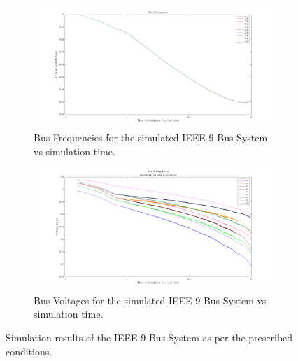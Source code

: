 \begin{figure}[!htpb]
	\centering
	\begin{subfigure}{\textwidth}
		\centering
		\includegraphics[scale=0.25]{../figures/analysis_matlab/frequencies_run02}
		\caption{Bus Frequencies for the simulated IEEE 9 Bus System vs simulation time.}
	\end{subfigure}
	
	\begin{subfigure}{\textwidth}
		\centering
		\includegraphics[scale=0.25]{../figures/analysis_matlab/voltages_run02}
		\caption{Bus Voltages for the simulated IEEE 9 Bus System vs simulation time.}
	\end{subfigure}

	\caption{Simulation results of the IEEE 9 Bus System as per the prescribed conditions.}
\end{figure}

